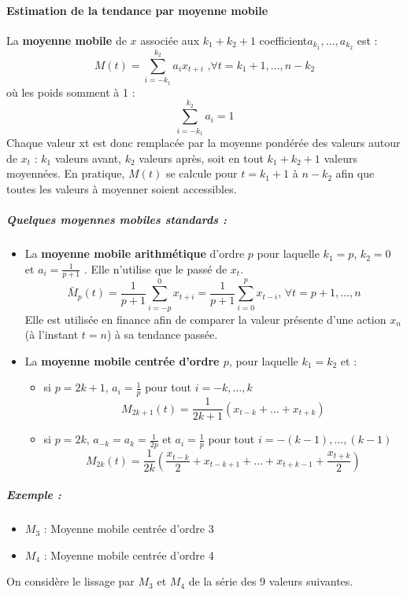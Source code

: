 \paragraph{Estimation de la tendance par moyenne mobile}
La \textbf{moyenne mobile} de $x$ associée aux $k_{1} +k_{2} + 1$ coefficient$ a_{k_{1}},\dots,a_{k_{2}}$ est : 
$$M(t) = \sum_{i=-k_{1}}^{k_{2}}a_{i}x_{t+i}\textrm{ ,}\forall t = k_{1} + 1,\dots, n-k_{2}$$
où les poids somment à 1 :
$$\sum_{i=-k_{1}}^{k_{2}}a_{i}=1$$
Chaque valeur xt est donc remplacée par la moyenne pondérée des valeurs autour de $x_{t}$ : $k_{1}$ valeurs avant, $k_{2}$ valeurs après, soit en tout $k_{1} + k_{2} + 1$ valeurs moyennées.\newline
En pratique, $M(t)$ se calcule pour $t = k_{1} + 1$ à $n-k_{2}$ afin que toutes les valeurs à moyenner soient accessibles.
\subparagraph{Quelques moyennes mobiles standards :}
\begin{itemize}
\item  La \textbf{moyenne mobile arithmétique} d'ordre $p$ pour laquelle $k_{1} = p$, $k_{2} = 0$ et $a_{i} = \frac{1}{p+1}$ . Elle n'utilise que le passé de $x_{t}$.
$$\bar{M}_{p}(t)=\frac{1}{p+1}\sum_{i=-p}^{0}x_{t+i} = \frac{1}{p+1}\sum_{i=0}^{p}x_{t-i}\textrm{, }\forall t = p+1,\dots, n$$
Elle est utilisée en finance afin de comparer la valeur présente d'une action $x_{n}$ (à l'instant $t = n$) à sa tendance passée.
\item La \textbf{moyenne mobile centrée d'ordre $p$}, pour laquelle $k_{1} = k_{2}$ et :
\begin{itemize}
\item si $p=2k+1$, $a_{i} = \frac{1}{p}$ pour tout $i= -k,\dots,k$
$$M_{2k+1}(t) = \frac{1}{2k+1}(x_{t-k}+\dots+x_{t+k})$$
\item si $p=2k$, $a_{-k} = a_{k} = \frac{1}{2p}$ et $a_{i} = \frac{1}{p}$ pour tout $i= -(k-1),\dots,(k-1)$
$$M_{2k}(t) = \frac{1}{2k}\left(\frac{x_{t-k}}{2} + x_{t-k+1}+\dots+x_{t+k-1}+\frac{x_{t+k}}{2}\right)$$
\end{itemize}
\end{itemize}
\subparagraph{Exemple :}
\begin{itemize}
\item $M_{3}$ : Moyenne mobile centrée d'ordre 3
\item $M_{4}$ : Moyenne mobile centrée d'ordre 4
\end{itemize}
On considère le lissage par $M_{3}$ et $M_{4}$ de la série des 9 valeurs suivantes.


